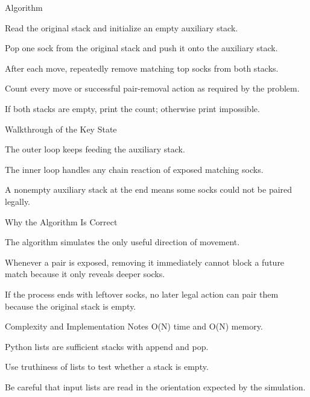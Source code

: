 \documentclass[aspectratio=169,11pt]{beamer}
\begin{document}
\begin{frame}{Algorithm}
\begin{tightitemize}
  \item Read the original stack and initialize an empty auxiliary stack.
  \item Pop one sock from the original stack and push it onto the auxiliary stack.
  \item After each move, repeatedly remove matching top socks from both stacks.
  \item Count every move or successful pair-removal action as required by the problem.
  \item If both stacks are empty, print the count; otherwise print impossible.
\end{tightitemize}
\end{frame}

\begin{frame}{Walkthrough of the Key State}
\begin{tightitemize}
  \item The outer loop keeps feeding the auxiliary stack.
  \item The inner loop handles any chain reaction of exposed matching socks.
  \item A nonempty auxiliary stack at the end means some socks could not be paired legally.
\end{tightitemize}
\end{frame}

\begin{frame}{Why the Algorithm Is Correct}
\begin{tightitemize}
  \item The algorithm simulates the only useful direction of movement.
  \item Whenever a pair is exposed, removing it immediately cannot block a future match because it only reveals deeper socks.
  \item If the process ends with leftover socks, no later legal action can pair them because the original stack is empty.
\end{tightitemize}
\end{frame}

\begin{frame}{Complexity and Implementation Notes}
\small
{} O(N) time and O(N) memory.

\vspace{0.3cm}
\begin{tightitemize}
  \item Python lists are sufficient stacks with append and pop.
  \item Use truthiness of lists to test whether a stack is empty.
  \item Be careful that input lists are read in the orientation expected by the simulation.
\end{tightitemize}
\end{frame}
\end{document}
